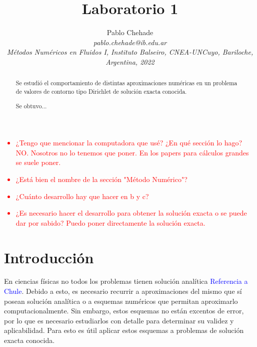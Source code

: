 \documentclass[aps,prb,twocolumn,superscriptaddress,floatfix,longbibliography]{revtex4-2}
\newif\ifptitle
\newif\ifpnumber
\newcounter{para}
\newcommand\ptitle[1]{\par\refstepcounter{para}
{\ifpnumber{\noindent\textcolor{lightgray}{\textbf{\thepara}}\indent}\fi}
{\ifptitle{\textbf{[{#1}]}}\fi}}
\begin{document}
\newcommand{\mytitle}{Laboratorio 1}

\title{\mytitle}

\author{Pablo Chehade \\
    \small \textit{pablo.chehade@ib.edu.ar} \\
    \small \textit{Métodos Numéricos en Fluidos I, Instituto Balseiro, CNEA-UNCuyo, Bariloche, Argentina, 2022} \\}


\begin{abstract}

Se estudió el comportamiento de distintas aproximaciones numéricas en un problema de valores de contorno tipo Dirichlet de solución exacta conocida.


Se obtuvo...

\end{abstract}

\maketitle

\textcolor{red}{
\begin{itemize}
    \item ¿Tengo que mencionar la computadora que usé? ¿En qué sección lo hago? NO. Nosotros no lo tenemos que poner. En los papers para cálculos grandes se suele poner.
    \item ¿Está bien el nombre de la sección "Método Numérico"?
    \item ¿Cuánto desarrollo hay que hacer en b y c?
    \item ¿Es necesario hacer el desarrollo para obtener la solución exacta o se puede dar por sabido? Puedo poner directamente la solución exacta.
\end{itemize}}

\section{Introducción}
\ptitle{En física, no todos los problemas tienen solución analítica, muchas veces es necesario recurrir a aproximaciones}

En ciencias físicas no todos los problemas tienen solución analítica \textcolor{blue}{Referencia a Chule}. Debido a esto, es necesario recurrir a aproximaciones del mismo que sí posean solución analítica o a esquemas numéricos que permitan aproximarlo computacionalmente. Sin embargo, estos esquemas no están excentos de error, por lo que es necesario estudiarlos con detalle para determinar su validez y aplicabilidad. Para esto es útil aplicar estos esquemas a problemas de solución exacta conocida.
\end{document}
